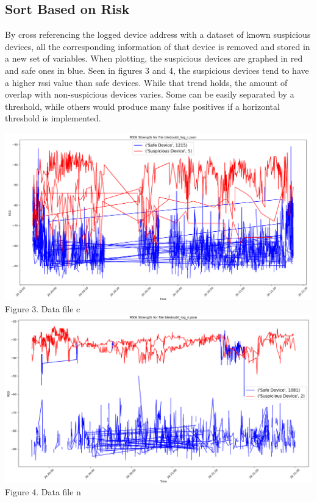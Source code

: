 \documentclass{article}
\begin{document}
\begin{multicols}{2}
\subsection{Sort Based on Risk}
By cross referencing the logged device address with a dataset of known suspicious devices, all the corresponding information of that device is removed and stored in a new set of variables. When plotting, the suspicious devices are graphed in red and safe ones in blue. Seen in figures 3 and 4, the suspicious devices tend to have a higher rssi value than safe devices. While that trend holds, the amount of overlap with non-suspicious devices varies. Some can be easily separated by a threshold, while others would produce many false positives if a horizontal threshold is implemented.
\begin{center}
\includegraphics[width=1\linewidth]{final-output-c.png}
Figure 3. Data file c
\includegraphics[width=1\linewidth]{final-output-N.png}
Figure 4. Data file n
\end{center}




\end{multicols}
\end{document}
